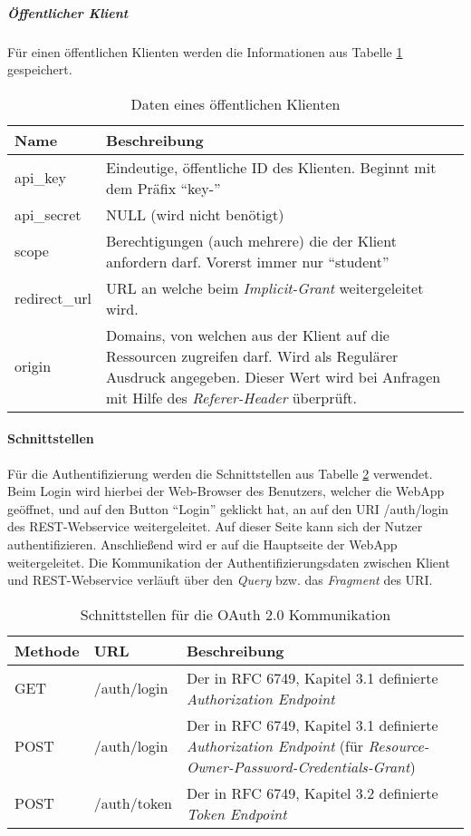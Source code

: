\subparagraph{Öffentlicher Klient}
Für einen öffentlichen Klienten werden die Informationen aus Tabelle  \ref{tab:api-auth-public-client-data} gespeichert. \\
\begin{table}
	\begin{tabularx}{\textwidth}{@{} | X | X | @{}}
		\hline
		\textbf{Name} & \textbf{Beschreibung}\\ \hline \hline
		api\_key & Eindeutige, öffentliche ID des Klienten. Beginnt mit dem Präfix \enquote{key-} \\ \hline
		api\_secret & NULL (wird nicht benötigt) \\ \hline
		scope & Berechtigungen (auch mehrere) die der Klient anfordern darf. Vorerst immer nur \enquote{student} \\ \hline
		redirect\_url & URL an welche beim \textit{Implicit-Grant} weitergeleitet wird. \\ \hline
		origin & Domains, von welchen aus der Klient auf die Ressourcen zugreifen darf. Wird als Regulärer Ausdruck angegeben. Dieser Wert wird bei Anfragen mit Hilfe des \textit{Referer-Header} überprüft. \\
		\hline
	\end{tabularx}
\caption{Daten eines öffentlichen Klienten}
\label{tab:api-auth-public-client-data}
\end{table}
\paragraph{Schnittstellen}
Für die Authentifizierung werden die Schnittstellen aus Tabelle \ref{tab:api-auth-endpoints} verwendet.
Beim Login wird hierbei der Web-Browser des Benutzers, welcher die WebApp geöffnet, und auf den Button \enquote{Login} geklickt hat, an auf den URI /auth/login des REST-Webservice weitergeleitet. Auf dieser Seite kann sich der Nutzer authentifizieren. Anschließend wird er auf die Hauptseite der WebApp weitergeleitet. Die Kommunikation der Authentifizierungsdaten zwischen Klient und REST-Webservice verläuft über den \textit{Query} \cite[Kap 3.4]{rfc3986} bzw. das \textit{Fragment} \cite[Kap. 3.5]{rfc3986} des URI.

\begin{table}
	\begin{tabularx}{\textwidth}{@{} | X | X | X | @{}}
		\hline
		\textbf{Methode} & \textbf{URL} & \textbf{Beschreibung} \\ \hline \hline
		GET & /auth/login & Der in RFC 6749, Kapitel 3.1 definierte \textit{Authorization Endpoint} \\ \hline
		POST & /auth/login & Der in RFC 6749, Kapitel 3.1 definierte \textit{Authorization Endpoint} (für \textit{Resource-Owner-Password-Credentials-Grant}) \\ \hline
		POST & /auth/token & Der in RFC 6749, Kapitel 3.2 definierte \textit{Token Endpoint} \\ \hline
	\end{tabularx}
\caption{Schnittstellen für die OAuth 2.0 Kommunikation}
\label{tab:api-auth-endpoints}
\end{table}


